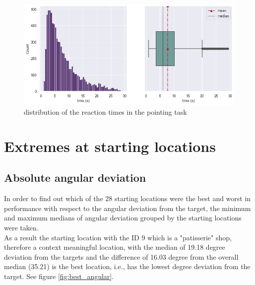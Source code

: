 \begin{figure}[h]
	\centering
	\includegraphics[width=150mm]{figures/RT_hist_box_23.png}
	\caption[Distribution of reaction times]{distribution of the  reaction times in the pointing task}
	\label{fig:rt_dists}
\end{figure}

\section{Extremes at starting locations}

\subsection{Absolute angular deviation}

In order to find out which of the 28 starting locations were the best and worst in performance with respect to the angular deviation from the target, the minimum and maximum medians of angular deviation grouped by the starting locations were taken.\\
As a result the starting location with the ID 9 which is a "patisserie" shop, therefore a context meaningful location, with the median of 19.18 degree deviation from the targets and the difference of 16.03 degree from the overall median (35.21) is the best location, i.e., has the lowest degree deviation from the target. See figure \ref{fig:best_angular}.\\

